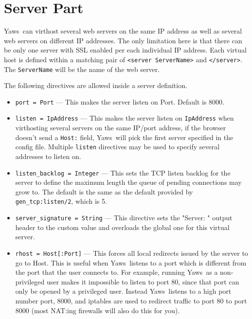 \documentclass[11pt,oneside,english]{book}
\newcommand{\Yaws}            %
        {{\sc Yaws}}
\begin{document}
\section{Server Part}

\Yaws\ can virthost several web servers on the same IP address as well
as several web servers on different IP addresses.  The only limitation
here is that there can be only one server with SSL enabled per each
individual IP address.  Each virtual host is defined within a matching
pair of \verb+<server ServerName>+ and \verb+</server>+.  The
\verb+ServerName+ will be the name of the web server.

The following directives are allowed inside a server definition.

\begin{itemize}

\item       \verb+port = Port+ ---
              This makes the server listen on Port. Default is 8000.

\item        \verb+listen = IpAddress+ ---
              This makes the  server  listen  on  \verb+IpAddress+  when
              virthosting  several  servers  on  the same IP/port
              address, if the browser doesn't send a \verb+Host:+ field,
              \Yaws\   will  pick  the first server specified in the
              config file. Multiple \verb+listen+ directives may be
              used to specify several addresses to listen on.

\item        \verb+listen_backlog = Integer+ ---
              This sets the TCP listen backlog for the server to
              define the maximum length the queue of pending
              connections may grow to. The default is the same as
              the default provided by \verb+gen_tcp:listen/2+, which
              is 5.

\item        \verb+server_signature = String+ ---
              This directive sets the "Server: " output header to the custom
              value and overloads the global one for this virtual server.

\item       \verb+rhost = Host[:Port]+ ---
             This forces all local redirects issued by the server to go to Host.
             This is useful when \Yaws\ listens to a port which is different
             from the port that the user connects to. For example, running
             \Yaws\ as a non-privileged user makes it impossible to listen to
             port 80, since that port can only be opened by a privileged
             user. Instead \Yaws\ listens to a high port number port, 8000, and
             iptables are used to redirect traffic to port 80 to port 8000 (most
             NAT:ing firewalls will also do this for you).


\end{itemize}
\end{document}
